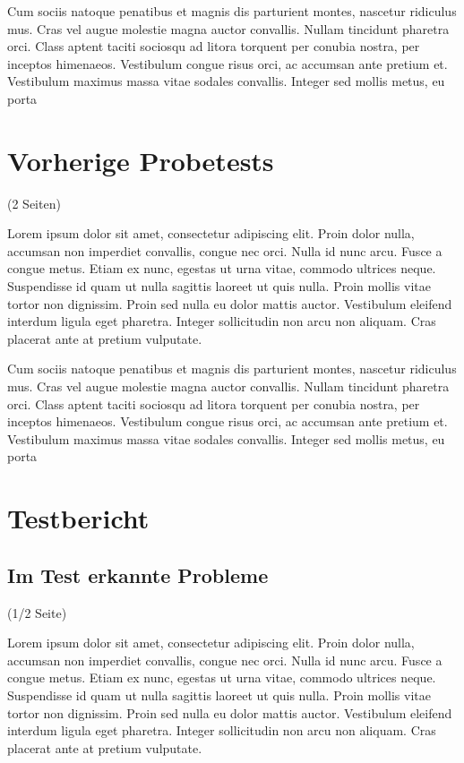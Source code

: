 Cum sociis natoque penatibus et magnis dis parturient montes, nascetur ridiculus mus. Cras vel augue molestie magna auctor convallis. Nullam tincidunt pharetra orci. Class aptent taciti sociosqu ad litora torquent per conubia nostra, per inceptos himenaeos. Vestibulum congue risus orci, ac accumsan ante pretium et. Vestibulum maximus massa vitae sodales convallis. Integer sed mollis metus, eu porta

\clearpage
\section{Vorherige Probetests}
\label{sec:probetests}

(2 Seiten)

Lorem ipsum dolor sit amet, consectetur adipiscing elit. Proin dolor nulla, accumsan non imperdiet convallis, congue nec orci. Nulla id nunc arcu. Fusce a congue metus. Etiam ex nunc, egestas ut urna vitae, commodo ultrices neque. Suspendisse id quam ut nulla sagittis laoreet ut quis nulla. Proin mollis vitae tortor non dignissim. Proin sed nulla eu dolor mattis auctor. Vestibulum eleifend interdum ligula eget pharetra. Integer sollicitudin non arcu non aliquam. Cras placerat ante at pretium vulputate.

Cum sociis natoque penatibus et magnis dis parturient montes, nascetur ridiculus mus. Cras vel augue molestie magna auctor convallis. Nullam tincidunt pharetra orci. Class aptent taciti sociosqu ad litora torquent per conubia nostra, per inceptos himenaeos. Vestibulum congue risus orci, ac accumsan ante pretium et. Vestibulum maximus massa vitae sodales convallis. Integer sed mollis metus, eu porta

\clearpage
\section{Testbericht}
\label{sec:testbericht}

\subsection{Im Test erkannte Probleme}
\label{sec:foundproblemes}

(1/2 Seite)

Lorem ipsum dolor sit amet, consectetur adipiscing elit. Proin dolor nulla, accumsan non imperdiet convallis, congue nec orci. Nulla id nunc arcu. Fusce a congue metus. Etiam ex nunc, egestas ut urna vitae, commodo ultrices neque. Suspendisse id quam ut nulla sagittis laoreet ut quis nulla. Proin mollis vitae tortor non dignissim. Proin sed nulla eu dolor mattis auctor. Vestibulum eleifend interdum ligula eget pharetra. Integer sollicitudin non arcu non aliquam. Cras placerat ante at pretium vulputate.

